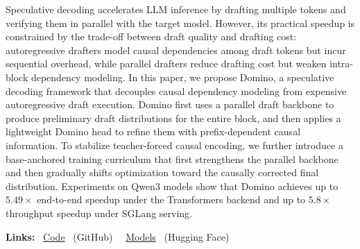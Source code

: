 
Speculative decoding accelerates LLM inference by drafting multiple tokens and verifying them in parallel with the target model. However, its practical speedup is constrained by the trade-off between draft quality and drafting cost: autoregressive drafters model causal dependencies among draft tokens but incur sequential overhead, while parallel drafters reduce drafting cost but weaken intra-block dependency modeling. In this paper, we propose Domino, a speculative decoding framework that decouples causal dependency modeling from expensive autoregressive draft execution. Domino first uses a parallel draft backbone to produce preliminary draft distributions for the entire block, and then applies a lightweight Domino head to refine them with prefix-dependent causal information. To stabilize teacher-forced causal encoding, we further introduce a base-anchored training curriculum that first strengthens the parallel backbone and then gradually shifts optimization toward the causally corrected final distribution. Experiments on Qwen3 models show that Domino achieves up to \(5.49\times\) end-to-end speedup under the Transformers backend and up to \(5.8\times\) throughput speedup under SGLang serving. 
\begin{center}
\vspace{-0.5em}
{\small
\textbf{Links:} \ 
\href{https://github.com/jianuo-huang/Domino}{\textcolor{linkpink}{Code}}
\ (GitHub) \ \textnormal{\textbar }\ 
\href{https://huggingface.co/collections/Huang2020/domino}{\textcolor{linkpink}{Models}}
\ \textnormal{(Hugging Face)}
}
\vspace{-0.5em}
\end{center}